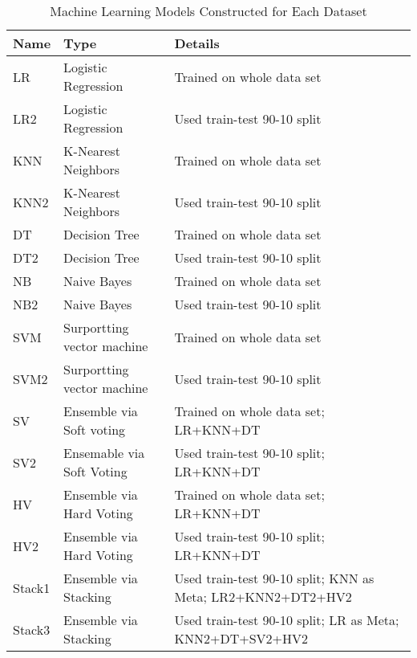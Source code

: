 \documentclass[preprint,1p,authoryear,times]{elsarticle}
\begin{document}
\begin{table}[htbp]
\caption{Machine Learning Models Constructed for Each Dataset}
\begin{scriptsize}
\begin{center}
\begin{tabular}{|l|l|l|}
\hline
\textbf{Name}	&\textbf{Type}	&\textbf{Details}\\ \hline
LR	&Logistic Regression	&Trained on whole data set\\ \hline
LR2	&Logistic Regression	&Used train-test 90-10 split \\ \hline
KNN	&K-Nearest Neighbors	&Trained on whole data set\\ \hline
KNN2	&K-Nearest Neighbors	&Used train-test 90-10 split\\ \hline
DT	&Decision Tree	&Trained on whole data set\\ \hline
DT2	&Decision Tree	&Used train-test 90-10 split\\ \hline
NB	&Naive Bayes	&Trained on whole data set\\ \hline
NB2	&Naive Bayes	&Used train-test 90-10 split\\ \hline
SVM	&Surportting vector machine	&Trained on whole data set\\ \hline
SVM2	&Surportting vector machine	&Used train-test 90-10 split\\ \hline
SV	&Ensemble via Soft voting	&Trained on whole data set; LR+KNN+DT\\ \hline
SV2	&Ensemable via Soft Voting	&Used train-test 90-10 split; LR+KNN+DT\\ \hline
HV	&Ensemble via Hard Voting	&Trained on whole data set; LR+KNN+DT\\ \hline
HV2	&Ensemble via Hard Voting	&Used train-test 90-10 split; LR+KNN+DT\\ \hline
Stack1	&Ensemble via Stacking	&Used train-test 90-10 split; KNN as Meta; LR2+KNN2+DT2+HV2\\ \hline 
Stack3	&Ensemble via Stacking	&Used train-test 90-10 split;  LR as Meta; KNN2+DT+SV2+HV2\\ \hline
\end{tabular}
\end{center}
\end{scriptsize}
\label{tab:ModelInfo}
\end{table}%
\end{document}
